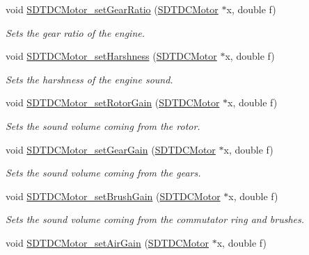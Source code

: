 \begin{DoxyCompactItemize}
void \hyperlink{group__dcmotor_ga1c81eff31c21ae35dc5b631b8434b7c1}{S\+D\+T\+D\+C\+Motor\+\_\+set\+Gear\+Ratio} (\hyperlink{group__dcmotor_ga55042fc98f1704ef2f8dd270e90c4cef}{S\+D\+T\+D\+C\+Motor} $\ast$x, double f)
\begin{DoxyCompactList}\small\item\em Sets the gear ratio of the engine. \end{DoxyCompactList}\item 
void \hyperlink{group__dcmotor_ga384adbb7ed127917e7a8c74f1e2f2265}{S\+D\+T\+D\+C\+Motor\+\_\+set\+Harshness} (\hyperlink{group__dcmotor_ga55042fc98f1704ef2f8dd270e90c4cef}{S\+D\+T\+D\+C\+Motor} $\ast$x, double f)
\begin{DoxyCompactList}\small\item\em Sets the harshness of the engine sound. \end{DoxyCompactList}\item 
void \hyperlink{group__dcmotor_gaabebcadc876c5c3b99ffce9d875d9165}{S\+D\+T\+D\+C\+Motor\+\_\+set\+Rotor\+Gain} (\hyperlink{group__dcmotor_ga55042fc98f1704ef2f8dd270e90c4cef}{S\+D\+T\+D\+C\+Motor} $\ast$x, double f)
\begin{DoxyCompactList}\small\item\em Sets the sound volume coming from the rotor. \end{DoxyCompactList}\item 
void \hyperlink{group__dcmotor_ga7338f00d20c753ccd2f4a8496076900b}{S\+D\+T\+D\+C\+Motor\+\_\+set\+Gear\+Gain} (\hyperlink{group__dcmotor_ga55042fc98f1704ef2f8dd270e90c4cef}{S\+D\+T\+D\+C\+Motor} $\ast$x, double f)
\begin{DoxyCompactList}\small\item\em Sets the sound volume coming from the gears. \end{DoxyCompactList}\item 
void \hyperlink{group__dcmotor_gad66558a813966abe1ae62510418e6c63}{S\+D\+T\+D\+C\+Motor\+\_\+set\+Brush\+Gain} (\hyperlink{group__dcmotor_ga55042fc98f1704ef2f8dd270e90c4cef}{S\+D\+T\+D\+C\+Motor} $\ast$x, double f)
\begin{DoxyCompactList}\small\item\em Sets the sound volume coming from the commutator ring and brushes. \end{DoxyCompactList}\item 
void \hyperlink{group__dcmotor_ga452456af1c6fccdbfe3549d925f8d95f}{S\+D\+T\+D\+C\+Motor\+\_\+set\+Air\+Gain} (\hyperlink{group__dcmotor_ga55042fc98f1704ef2f8dd270e90c4cef}{S\+D\+T\+D\+C\+Motor} $\ast$x, double f)

\end{DoxyCompactItemize}

